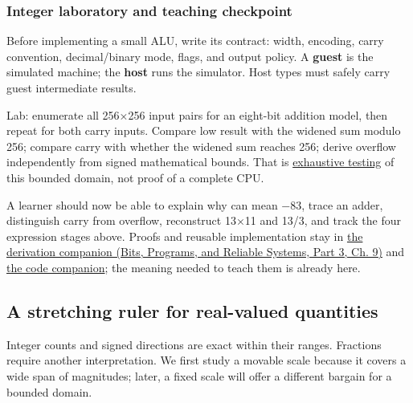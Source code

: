 \subsubsection{Integer laboratory and teaching checkpoint}\label{01-foundations-i-ch001-integer-laboratory-and-teaching-checkpoint}

\hypertarget{01-foundations-i-ch001-integer-laboratory-and-teaching-checkpoint}{}

Before implementing a small ALU, write its contract: width, encoding, carry convention, decimal/binary mode, flags, and output policy. A \textbf{guest} is the simulated machine; the \textbf{host} runs the simulator. Host types must safely carry guest intermediate results.

Lab: enumerate all 256×256 input pairs for an eight-bit addition model, then repeat for both carry inputs. Compare low result with the widened sum modulo 256; compare carry with whether the widened sum reaches 256; derive overflow independently from signed mathematical bounds. That is \hyperref[appendix-05db24ccc28a]{exhaustive testing} of this bounded domain, not proof of a complete CPU.

A learner should now be able to explain why  can mean −83, trace an adder, distinguish carry from overflow, reconstruct 13×11 and 13/3, and track the four expression stages above. Proofs and reusable implementation stay in \href{../01-Bits-Programs-and-Reliable-Systems-P03/main.pdf\#nameddest=01-foundations-i-ch011-m002---signed-representations-adders-and-arithmetic-policies}{the derivation companion (Bits, Programs, and Reliable Systems, Part 3, Ch. 9)} and \hyperref[appendix-4e2236f53445-m002---exhaustive-8-bit-addition-oracle-and-saturation]{the code companion}; the meaning needed to teach them is already here.

\subsection{A stretching ruler for real-valued quantities}\label{01-foundations-i-ch001-a-stretching-ruler-for-real-valued-quantities}

\hypertarget{01-foundations-i-ch001-a-stretching-ruler-for-real-valued-quantities}{}

Integer counts and signed directions are exact within their ranges. Fractions require another interpretation. We first study a movable scale because it covers a wide span of magnitudes; later, a fixed scale will offer a different bargain for a bounded domain.

